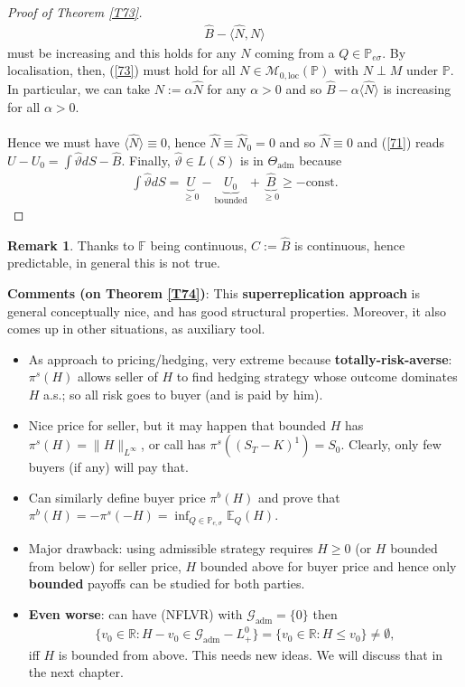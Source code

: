 \documentclass[12pt,a4paper, twoside]{article}
\theoremstyle{definition}
\newtheorem{rem}{Remark}[section]
\newcommand{\EE}{\mathbb{E}} %
\newcommand{\PP}{\mathbb{P}} %
\begin{document}
\begin{proof}[Proof of Theorem \ref{T73}]
\begin{align*} \label{73}
\hat{B}- \langle \hat{N}, N \rangle \tag{7.3}
\end{align*}
must be increasing and this holds for any $N$ coming from a $Q \in \mathbb{P}_{e \sigma}$. By localisation, then, (\ref{73}) must hold for all $N \in \mathcal{M}_{0, \text{loc}}( \PP)$ with $N \perp M$ under $\PP$. In particular, we can take $N:= \alpha \hat{N}$ for any $\alpha >0$ and so $\hat{B}- \alpha \langle \hat{N} \rangle$ is increasing for all $\alpha >0$. \\
\\
Hence we must have $\langle \hat{N} \rangle \equiv 0$, hence $\hat{N} \equiv \hat{N}_0 = 0$ and so $\hat{N} \equiv 0$ and (\ref{71}) reads $U-U_0 = \int \hat{\vartheta}dS - \hat{B}$. Finally, $\hat{\vartheta} \in L(S)$ is in $\Theta_\text{adm}$ because 
\begin{align*}
\int \hat{\vartheta}dS = \underbrace{U}_{ \geq 0}-\underbrace{U_0}_{ \text{bounded}} + \underbrace{\hat{B}}_{ \geq 0} \geq - \text{const}.
\end{align*}
\end{proof}
\begin{rem} Thanks to $\mathbb{F}$ being continuous, $C:= \hat{B}$ is continuous, hence predictable, in general this is not true. 
\end{rem}
\noindent \textbf{Comments (on Theorem \ref{T74})}: This \textbf{superreplication approach} is general conceptually nice, and has good structural properties. Moreover, it also comes up in other situations, as auxiliary tool.
\begin{itemize}
\item As approach to pricing/hedging, very extreme because \textbf{totally-risk-averse}: $\pi^s(H)$ allows seller of $H$ to find hedging strategy whose outcome dominates $H$ a.s.; so all risk goes to buyer (and is paid by him).
\item Nice price for seller, but it may happen that bounded $H$ has $\pi^s(H) = \| H \|_{L^\infty}$, or call has $\pi^s((S_T-K)^1) = S_0$. Clearly,  only few buyers (if any) will pay that. 
\item Can similarly define buyer price $\pi^b(H)$ and prove that $\pi^b(H) = - \pi^s(-H)= \inf_{Q \in \PP_{e, \sigma}} \EE_Q(H)$. 
\item Major drawback: using admissible strategy requires $H \geq 0$ (or $H$ bounded from below) for seller price, $H$ bounded above for buyer price and hence only \textbf{bounded} payoffs can be studied for both parties.
\item \textbf{Even worse}: can have (NFLVR) with $\mathcal{G}_\text{adm}= \{0\}$ then 
\begin{align*}
\{v_0 \in \mathbb{R}: H-v_0 \in \mathcal{G}_\text{adm}-L_+^0 \} = \{ v_0 \in \mathbb{R}: H \leq v_0 \} \neq \emptyset,
\end{align*}
iff $H$ is bounded from above. This needs new ideas. We will discuss that in the next chapter.
\end{itemize}
\end{document}

